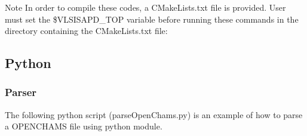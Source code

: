 \begin{DoxyNote}{Note}
In order to compile these codes, a C\+Make\+Lists.\+txt file is provided. User must set the \$\+V\+L\+S\+I\+S\+A\+P\+D\+\_\+\+T\+OP variable before running these commands in the directory containing the C\+Make\+Lists.\+txt file\+: 
\begin{DoxyCode}
\end{DoxyCode}

\end{DoxyNote}
\hypertarget{openchams_openChamsPython}{}\subsection{Python}\label{openchams_openChamsPython}
\hypertarget{openchams_openChamsParsePython}{}\subsubsection{Parser}\label{openchams_openChamsParsePython}
The following python script ({\ttfamily parse\+Open\+Chams.\+py}) is an example of how to parse a O\+P\+E\+N\+C\+H\+A\+MS file using python module. 
